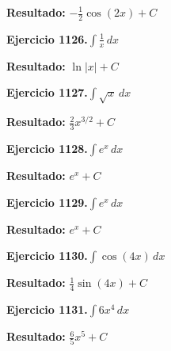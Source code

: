 \documentclass[10pt,a4paper]{article}
\begin{document}
\begin{solbox}
\textbf{Resultado:} \(\displaystyle -\frac{1}{2}\cos(2x) + C\)
\end{solbox}

\newpage
\begin{ejbox}
\textbf{Ejercicio 1126.}\quad $\int \frac{1}{x}\,dx$
\end{ejbox}

\begin{solbox}
\textbf{Resultado:} \(\displaystyle \ln|x| + C\)
\end{solbox}

\begin{ejbox}
\textbf{Ejercicio 1127.}\quad $\int \sqrt{x}\,dx$
\end{ejbox}

\begin{solbox}
\textbf{Resultado:} \(\displaystyle \frac{2}{3}x^{3/2} + C\)
\end{solbox}

\begin{ejbox}
\textbf{Ejercicio 1128.}\quad $\int e^x\,dx$
\end{ejbox}

\begin{solbox}
\textbf{Resultado:} \(\displaystyle e^x + C\)
\end{solbox}

\newpage
\begin{ejbox}
\textbf{Ejercicio 1129.}\quad $\int e^x\,dx$
\end{ejbox}

\begin{solbox}
\textbf{Resultado:} \(\displaystyle e^x + C\)
\end{solbox}

\begin{ejbox}
\textbf{Ejercicio 1130.}\quad $\int \cos(4x)\,dx$
\end{ejbox}

\begin{solbox}
\textbf{Resultado:} \(\displaystyle \frac{1}{4}\sin(4x) + C\)
\end{solbox}

\begin{ejbox}
\textbf{Ejercicio 1131.}\quad $\int 6x^{4}\,dx$
\end{ejbox}

\begin{solbox}
\textbf{Resultado:} \(\displaystyle \frac{6}{5}x^{5} + C\)
\end{solbox}
\end{document}
